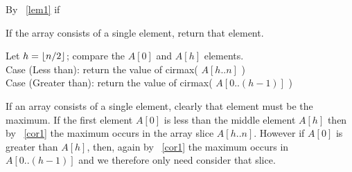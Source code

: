\documentclass{amsart}
\theoremstyle{definition}
\theoremstyle{remark}
\numberwithin{equation}{section}
\DeclarePairedDelimiter{\floor}{\lfloor}{\rfloor}
\begin{document}
By ~\ref{lem1} if 


If the array consists of a single element, return that element.

Let $h = \floor{n/2}$; compare the $A[0]$ and $A[h]$ elements. \\

Case (Less than): return the value of cirmax( $A[h..n]$ ) \\

Case (Greater than): return the value of cirmax( $A[0..(h-1)]$ ) \\

\proof

If an array consists of a single element, clearly that element must
be the maximum. If the first element $A[0]$ is less than the middle
element $A[h]$ then by ~\ref{cor1} the maximum occurs in the array slice
$A[h..n]$. However if $A[0]$ is greater than $A[h]$, then, again by
~\ref{cor1} the maximum occurs in $A[0..(h-1)]$ and we therefore only
need consider that slice.

\section{}


\subsection*{}
\end{document}
